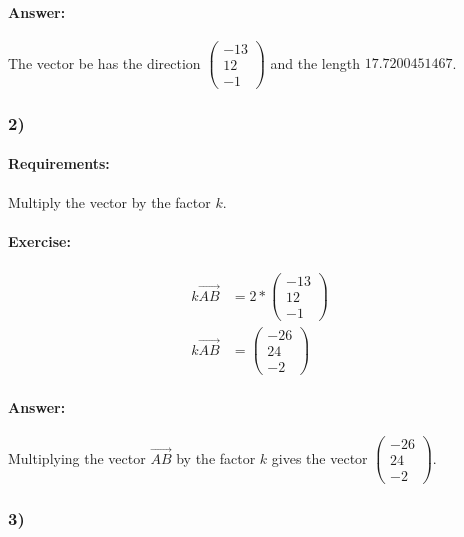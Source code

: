 \documentclass{article}
\begin{document}
\paragraph{Answer:}
The vector be has the direction $\begin{pmatrix}
        -13 \\ 
        12 \\
        -1
    \end{pmatrix}$ and the length $17.7200451467$.

\subsubsection{2)}

\paragraph{Requirements:}
Multiply the vector by the factor $k$.

\paragraph{Exercise:}

\begin{align}
    k\vec{AB} &= 2 * \begin{pmatrix}
        -13 \\ 
        12 \\
        -1
    \end{pmatrix} \\
    k\vec{AB} &= \begin{pmatrix}
        -26 \\ 
        24 \\ 
        -2
    \end{pmatrix}
\end{align}

\paragraph{Answer:}
Multiplying the vector $\vec{AB}$ by the factor $k$ gives the vector $\begin{pmatrix}
        -26 \\ 
        24 \\ 
        -2
    \end{pmatrix}$.

\subsubsection{3)}
\end{document}
